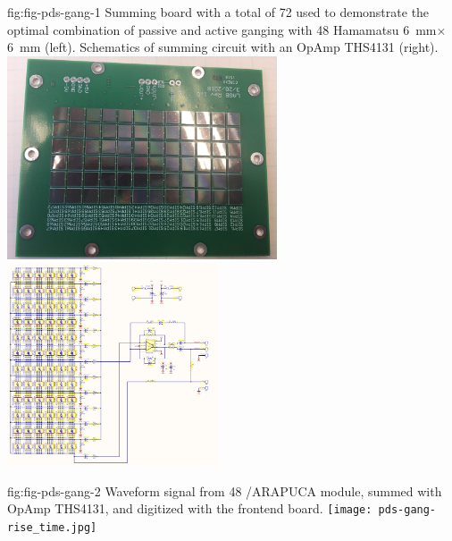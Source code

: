 \begin{dunefigure}
 {fig:fig-pds-gang-1}
 {Summing board with a total of 72  used to demonstrate the optimal combination of passive and active ganging with 48 Hamamatsu \SI{6}{mm}$\times$\SI{6}{mm}  (left).  Schematics of summing circuit with an OpAmp THS4131 (right).}
\includegraphics[height=6cm]{graphics/pds_gang_fig1.jpg}
\includegraphics[height=6cm]{graphics/pds_gang_fig2.png}
\end{dunefigure}

\begin{dunefigure}
 {fig:fig-pds-gang-2}
 {Waveform signal from 48 /ARAPUCA module, summed with OpAmp THS4131, and digitized with the  frontend board.}
\texttt{[image: pds-gang-rise\_time.jpg]}
\end{dunefigure}

